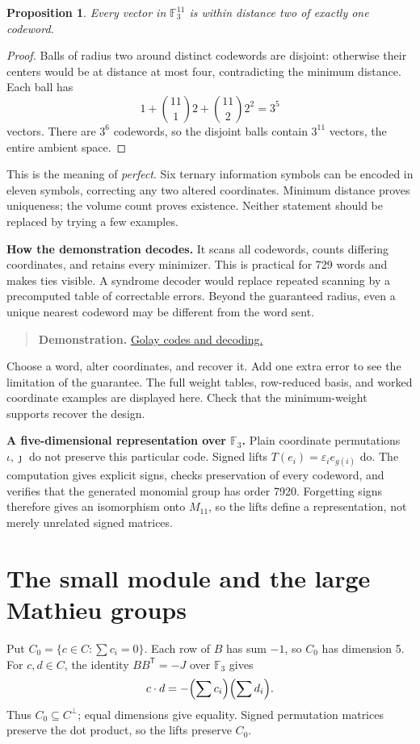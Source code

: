 \documentclass[12pt,letterpaper]{article}
\newtheorem{proposition}[theorem]{Proposition}
\theoremstyle{definition}
\theoremstyle{remark}
\newenvironment{toolnote}{\begin{quote}\small\color{navy}}{\end{quote}}
\newcommand{\F}{\mathbb F}\newcommand{\Z}{\mathbb Z}
\newcommand{\pageheading}[1]{\clearpage\section{#1}}
\newcommand{\demolink}[2]{\href{https://gtevelev-max.github.io/mathieu/\##1}{#2}}
\newcommand{\demobox}[2]{\begin{toolnote}\textbf{Demonstration.} \demolink{#1}{#2}\end{toolnote}}
\begin{document}
\begin{proposition}
Every vector in $\F_3^{11}$ is within distance two of exactly one codeword.
\end{proposition}
\begin{proof}
Balls of radius two around distinct codewords are disjoint: otherwise their centers would be at distance at most four, contradicting the minimum distance. Each ball has
\[
 1+\binom{11}{1}2+\binom{11}{2}2^2=3^5
\]
vectors. There are $3^6$ codewords, so the disjoint balls contain $3^{11}$ vectors, the entire ambient space.
\end{proof}
This is the meaning of \emph{perfect}. Six ternary information symbols can be encoded in eleven symbols, correcting any two altered coordinates. Minimum distance proves uniqueness; the volume count proves existence. Neither statement should be replaced by trying a few examples.

\textbf{How the demonstration decodes.} It scans all codewords, counts differing coordinates, and retains every minimizer. This is practical for 729 words and makes ties visible. A syndrome decoder would replace repeated scanning by a precomputed table of correctable errors. Beyond the guaranteed radius, even a unique nearest codeword may be different from the word sent.

\demobox{codes?group=11}{Golay codes and decoding.} Choose a word, alter coordinates, and recover it. Add one extra error to see the limitation of the guarantee. The full weight tables, row-reduced basis, and worked coordinate examples are displayed here. Check that the minimum-weight supports recover the design.

\textbf{A five-dimensional representation over $\F_3$.} Plain coordinate permutations $\iota,\jmath$ do not preserve this particular code. Signed lifts $T(e_i)=\varepsilon_i e_{g(i)}$ do. The computation gives explicit signs, checks preservation of every codeword, and verifies that the generated monomial group has order 7920. Forgetting signs therefore gives an isomorphism onto $M_{11}$, so the lifts define a representation, not merely unrelated signed matrices.

\pageheading{The small module and the large Mathieu groups}
Put $C_0=\{c\in C:\sum c_i=0\}$. Each row of $B$ has sum $-1$, so $C_0$ has dimension 5. For $c,d\in C$, the identity $BB^{\mathsf T}=-J$ over $\F_3$ gives
\[
 c\cdot d=-\Bigl(\sum c_i\Bigr)\Bigl(\sum d_i\Bigr).
\]
Thus $C_0\subseteq C^\perp$; equal dimensions give equality. Signed permutation matrices preserve the dot product, so the lifts preserve $C_0$.
\end{document}
